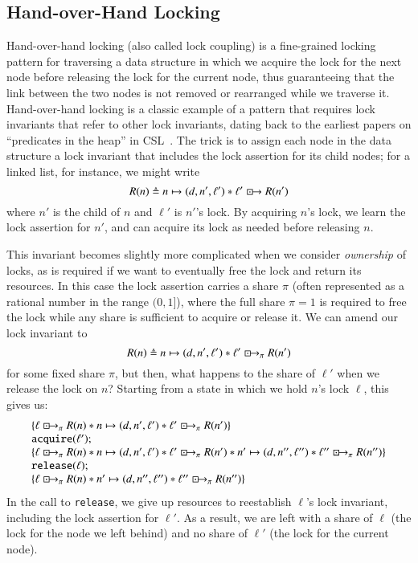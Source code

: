 \documentclass[runningheads]{llncs}
\newcommand{\islock}{\boxdotright}
\begin{document}
\subsection{Hand-over-Hand Locking}
\label{selflock}

Hand-over-hand locking (also called lock coupling) is a fine-grained locking pattern for traversing a data structure in which we acquire the lock for the next node before releasing the lock for the current node, thus guaranteeing that the link between the two nodes is not removed or rearranged while we traverse it. Hand-over-hand locking is a classic example of a pattern that requires lock invariants that refer to other lock invariants, dating back to the earliest papers on ``predicates in the heap'' in CSL~\cite{gotsman}. The trick is to assign each node in the data structure a lock invariant that includes the lock assertion for its child nodes; for a linked list, for instance, we might write \begin{equation}\label{inv1}R(n) \triangleq n \mapsto (d, n', \ell') * \ell' \islock R(n')\end{equation} where $n'$ is the child of $n$ and $\ell'$ is $n'$'s lock. By acquiring $n$'s lock, we learn the lock assertion for $n'$, and can acquire its lock as needed before releasing $n$.

This invariant becomes slightly more complicated when we consider \emph{ownership} of locks, as is required if we want to eventually free the lock and return its resources. In this case the lock assertion carries a share $\pi$ (often represented as a rational number in the range $(0, 1]$), where the full share $\pi = 1$ is required to free the lock while any share is sufficient to acquire or release it. We can amend our lock invariant to \begin{equation}R(n) \triangleq n \mapsto (d, n', \ell') * \ell' \islock_\pi R(n')\end{equation} for some fixed share $\pi$, but then, what happens to the share of $\ell'$ when we release the lock on $n$? Starting from a state in which we hold $n$'s lock $\ell$, this gives us:
\[\begin{array}{l}
\{ \ell \islock_\pi R(n) * n \mapsto (d, n', \ell') * \ell' \islock_\pi R(n') \}\\
\texttt{acquire}(\ell');\\
\{ \ell \islock_\pi R(n) * n \mapsto (d, n', \ell') * \ell' \islock_\pi R(n') * n' \mapsto (d, n'', \ell'') * \ell'' \islock_\pi R(n'') \}\\
\texttt{release}(\ell);\\
\{ \ell \islock_\pi R(n) * n' \mapsto (d, n'', \ell'') * \ell'' \islock_\pi R(n'') \}
\end{array}\]
In the call to \texttt{release}, we give up resources to reestablish $\ell$'s lock invariant, including the lock assertion for $\ell'$. As a result, we are left with a share of $\ell$ (the lock for the node we left behind) and no share of $\ell'$ (the lock for the current node).
\end{document}
